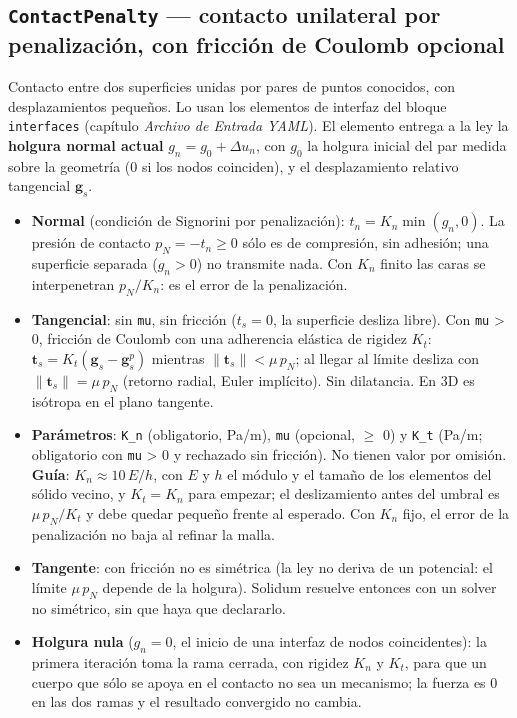 \documentclass[11pt,oneside]{report}
\begin{document}
\subsection{\texttt{ContactPenalty} --- contacto unilateral por penalización, con fricción de Coulomb opcional}

Contacto entre dos superficies unidas por pares de puntos conocidos, con desplazamientos pequeños. Lo usan los elementos de interfaz del bloque \texttt{interfaces} (capítulo \textit{Archivo de Entrada YAML}). El elemento entrega a la ley la \textbf{holgura normal actual} $g_n = g_0 + \Delta u_n$, con $g_0$ la holgura inicial del par medida sobre la geometría (0 si los nodos coinciden), y el desplazamiento relativo tangencial $\mathbf g_s$.

\begin{itemize}
  \item \textbf{Normal} (condición de Signorini por penalización): $t_n = K_n \min(g_n, 0)$. La presión de contacto $p_N = -t_n \ge 0$ sólo es de compresión, sin adhesión; una superficie separada ($g_n > 0$) no transmite nada. Con $K_n$ finito las caras se interpenetran $p_N/K_n$: es el error de la penalización.
  \item \textbf{Tangencial}: sin \texttt{mu}, sin fricción ($t_s = 0$, la superficie desliza libre). Con \texttt{mu} \textgreater{} 0, fricción de Coulomb con una adherencia elástica de rigidez $K_t$: $\mathbf t_s = K_t(\mathbf g_s - \mathbf g_s^p)$ mientras $\|\mathbf t_s\| < \mu\,p_N$; al llegar al límite desliza con $\|\mathbf t_s\| = \mu\,p_N$ (retorno radial, Euler implícito). Sin dilatancia. En 3D es isótropa en el plano tangente.
  \item \textbf{Parámetros}: \texttt{K\_n} (obligatorio, Pa/m), \texttt{mu} (opcional, \ensuremath{\ge} 0) y \texttt{K\_t} (Pa/m; obligatorio con \texttt{mu} \textgreater{} 0 y rechazado sin fricción). No tienen valor por omisión. \textbf{Guía}: $K_n \approx 10\,E/h$, con $E$ y $h$ el módulo y el tamaño de los elementos del sólido vecino, y $K_t = K_n$ para empezar; el deslizamiento antes del umbral es $\mu\,p_N/K_t$ y debe quedar pequeño frente al esperado. Con $K_n$ fijo, el error de la penalización no baja al refinar la malla.
  \item \textbf{Tangente}: con fricción no es simétrica (la ley no deriva de un potencial: el límite $\mu\,p_N$ depende de la holgura). Solidum resuelve entonces con un solver no simétrico, sin que haya que declararlo.
  \item \textbf{Holgura nula} ($g_n = 0$, el inicio de una interfaz de nodos coincidentes): la primera iteración toma la rama cerrada, con rigidez $K_n$ y $K_t$, para que un cuerpo que sólo se apoya en el contacto no sea un mecanismo; la fuerza es 0 en las dos ramas y el resultado convergido no cambia.

\end{itemize}
\end{document}
